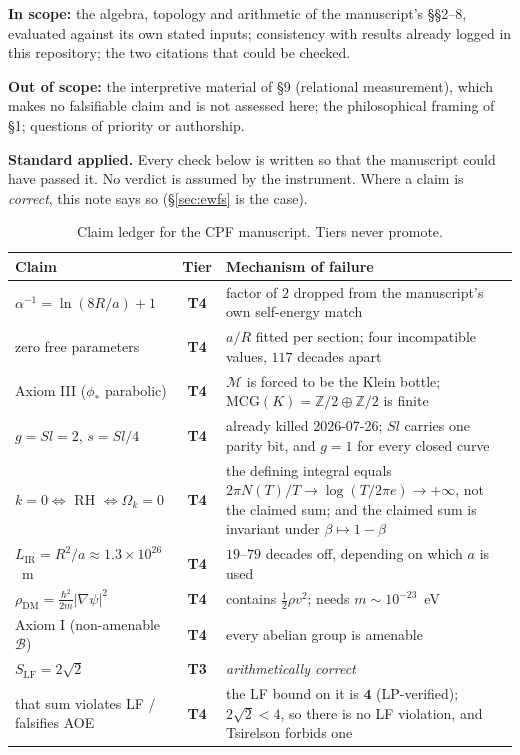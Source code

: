 \documentclass[11pt,a4paper]{article}
\newcommand{\Sl}{\mathit{Sl}}
\begin{document}
\textbf{In scope:} the algebra, topology and arithmetic of the manuscript's
\S\S2--8, evaluated against its own stated inputs; consistency with results already
logged in this repository; the two citations that could be checked.

\textbf{Out of scope:} the interpretive material of \S9 (relational measurement),
which makes no falsifiable claim and is not assessed here; the philosophical framing
of \S1; questions of priority or authorship.

\textbf{Standard applied.} Every check below is written so that the manuscript could
have passed it. No verdict is assumed by the instrument. Where a claim is
\emph{correct}, this note says so (\S\ref{sec:ewfs} is the case).

\begin{table}[h]
\centering
\small
\begin{tabular}{p{}cp{}}
\toprule
Claim & Tier & Mechanism of failure \\
\midrule
$\alpha^{-1}=\ln(8R/a)+1$ & \textbf{T4} & factor of $2$ dropped from the
  manuscript's own self-energy match \\
zero free parameters & \textbf{T4} & $a/R$ fitted per section; four incompatible
  values, $117$ decades apart \\
Axiom III ($\phi_*$ parabolic) & \textbf{T4} & $\mathcal{M}$ is forced to be the
  Klein bottle; $\mathrm{MCG}(K)=\mathbb{Z}/2\oplus\mathbb{Z}/2$ is finite \\
$g=\Sl=2$, $s=\Sl/4$ & \textbf{T4} & already killed 2026-07-26; $\Sl$ carries one
  parity bit, and $g=1$ for every closed curve \\
$k=0\Leftrightarrow$ RH $\Leftrightarrow\Omega_k=0$ & \textbf{T4} & the defining
  integral equals $2\pi N(T)/T\to\log(T/2\pi e)\to+\infty$, not the claimed sum; and
  the claimed sum is invariant under $\beta\mapsto1-\beta$ \\
$L_{\mathrm{IR}}=R^2/a\approx1.3\times10^{26}$~m & \textbf{T4} & $19$--$79$ decades
  off, depending on which $a$ is used \\
$\rho_{\mathrm{DM}}=\frac{\hbar^2}{2m}|\nabla\psi|^2$ & \textbf{T4} & contains
  $\tfrac12\rho v^2$; needs $m\sim10^{-23}$~eV \\
Axiom I (non-amenable $\mathcal{B}$) & \textbf{T4} & every abelian group is amenable \\
$S_{\mathrm{LF}}=2\sqrt2$ & \textbf{T3} & \emph{arithmetically correct} \\
that sum violates LF / falsifies AOE & \textbf{T4} & the LF bound on it is $\mathbf{4}$
  (LP-verified); $2\sqrt2<4$, so there is no LF violation, and Tsirelson forbids one \\
\bottomrule
\end{tabular}
\caption{Claim ledger for the CPF manuscript. Tiers never promote.}
\end{table}
\end{document}
